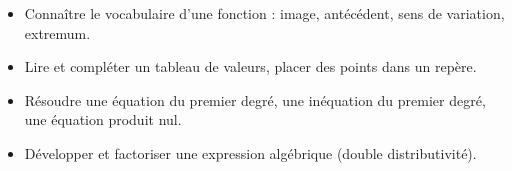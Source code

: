 \documentclass[10pt,a4paper]{article}
\begin{document}

\vspace{-0.3cm}

\begin{prerequis}
\begin{itemize}
    \item Connaître le vocabulaire d'une fonction : image, antécédent, sens de variation, extremum.
    \item Lire et compléter un tableau de valeurs, placer des points dans un repère.
    \item  Résoudre une équation du premier degré,  une inéquation du premier degré, une équation produit nul.
    \item Développer et factoriser une expression algébrique (double distributivité).
    
    
\end{itemize}
\end{prerequis}
\end{document}
